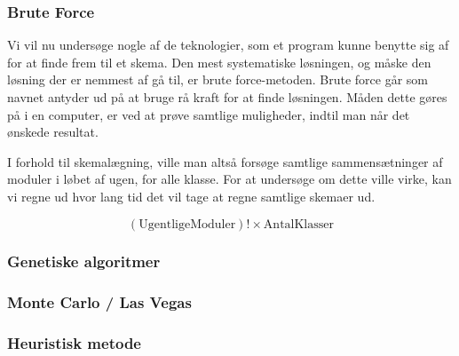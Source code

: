 \subsubsection{Brute Force}
Vi vil nu undersøge nogle af de teknologier, som et program kunne benytte sig af for at finde frem til et skema. Den mest systematiske løsningen, og måske den løsning der er nemmest af gå til, er brute force-metoden. Brute force går som navnet antyder ud på at bruge rå kraft for at finde løsningen. Måden dette gøres på i en computer, er ved at prøve samtlige muligheder, indtil man når det ønskede resultat\cite{BruteForce}.

I forhold til skemalægning, ville man altså forsøge samtlige sammensætninger af moduler i løbet af ugen, for alle klasse. For at undersøge om dette ville virke, kan vi regne ud hvor lang tid det vil tage at regne samtlige skemaer ud.

$$ (\text{UgentligeModuler})! \times \text{AntalKlasser} $$
\subsubsection{Genetiske algoritmer}
\subsubsection{Monte Carlo / Las Vegas}
\subsubsection{Heuristisk metode}
